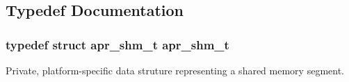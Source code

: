 \subsection{Typedef Documentation}
\hypertarget{group__apr__shm_ga79e8c16bdeaf7ade4ef0f935249e7c2f}{
\subsubsection[{apr\-\_\-shm\-\_\-t}]{\setlength{\rightskip}{0pt plus 5cm}typedef struct {\bf apr\-\_\-shm\-\_\-t} {\bf apr\-\_\-shm\-\_\-t}}}\label{group__apr__shm_ga79e8c16bdeaf7ade4ef0f935249e7c2f}
Private, platform-\/specific data struture representing a shared memory segment. 


